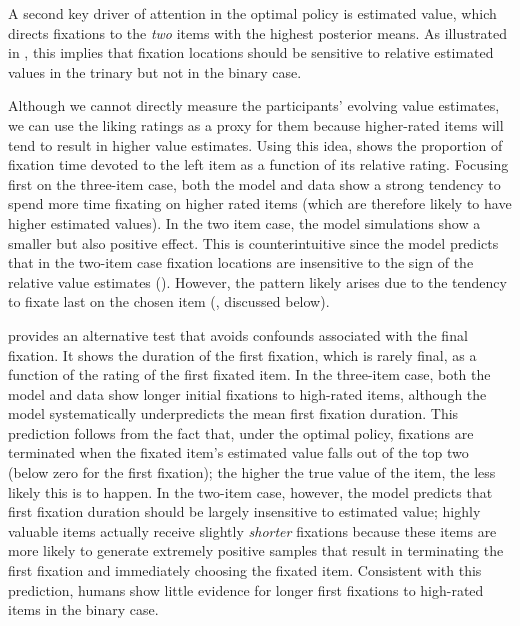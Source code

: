  
A second key driver of attention in the optimal policy is estimated value, which directs fixations to the \emph{two} items with the highest posterior means. As illustrated in , this implies that fixation locations should be sensitive to relative estimated values in the trinary but not in the binary case.

Although we cannot directly measure the participants' evolving value estimates, we can use the liking ratings as a proxy for them because higher-rated items will tend to result in higher value estimates. Using this idea,  shows the proportion of fixation time devoted to the left item as a function of its relative rating. Focusing first on the three-item case, both the model and data show a strong tendency to spend more time fixating on higher rated items (which are therefore likely to have higher estimated values). In the two item case, the model simulations show a smaller but also positive effect. This is counterintuitive since the model predicts that in the two-item case fixation locations are insensitive to the sign of the relative value estimates (). However, the pattern likely arises due to the tendency to fixate last on the chosen item (, discussed below).

 provides an alternative test that avoids confounds associated with the final fixation. It shows the duration of the first fixation, which is rarely final, as a function of the rating of the first fixated item. In the three-item case, both the model and data show longer initial fixations to high-rated items, although the model systematically underpredicts the mean first fixation duration. This prediction follows from the fact that, under the optimal policy, fixations are terminated when the fixated item's estimated value falls out of the top two (below zero for the first fixation); the higher the true value of the item, the less likely this is to happen. In the two-item case, however, the model predicts that first fixation duration should be largely insensitive to estimated value; highly valuable items actually receive slightly \emph{shorter} fixations because these items are more likely to generate extremely positive samples that result in terminating the first fixation and immediately choosing the fixated item. Consistent with this prediction, humans show little evidence for longer first fixations to high-rated items in the binary case.

